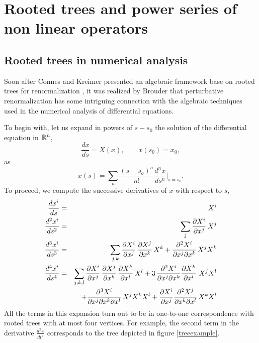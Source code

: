 \documentclass[10pt,here,feynmf]{article}
\begin{document}
\section{Rooted trees and power series of non linear operators}



\subsection{Rooted trees in numerical analysis}

Soon after Connes and Kreimer presented an algebraic framework base on rooted trees for renormalization \cite{ck0}, it was realized by Brouder \cite{brouder} that perturbative renormalization  has some intriguing connection with the algebraic techniques used in the numerical analysis of differential equations.

To begin with, let us expand in powers of $s-s_{0}$ the solution of the differential equation in ${\Bbb R}^{n}$, 
\begin{equation}
\frac{dx}{ds}=X(x),\qquad x(s_{0})=x_{0},\label{diffeq}
\end{equation}
as
\begin{equation}
x(s)=\sum_{n}\frac{(s-s_{o})^{n}}{n!}\frac{d^{n}x}{ds^{n}}\Big|_{s=s_{0}}.
\end{equation}
To proceed, we compute the successive derivatives of $x$ with respect to $s$,
\begin{eqnarray}
\frac{dx^{i}}{ds}&=&X^{i}\cr
\frac{d^{2}x^{i}}{ds^{2}}&=&\sum_{j}\frac{\partial X^{i}}{\partial x^{j}}\,X^{j}\cr
\frac{d^{3}x^{i}}{ds^{3}}&=&\sum_{j,k}\frac{\partial X^{i}}{\partial x^{j}}
\,\frac{\partial X^{j}}{\partial x^{k}}\,X^{k}
+\frac{\partial^{2}X^{i}}{\partial x^{j}\partial x^{k}}\,X^{j}X^{k}\cr
\frac{d^{4}x^{i}}{ds^{4}}&=&\sum_{j,k,l}\frac{\partial X^{i}}{\partial x^{j}}\,
\frac{\partial X^{j}}{\partial x^{k}}\,\frac{\partial X^{k}}{\partial x^{l}}\,X^{l}
+3\,\frac{\partial^{2}X^{i}}{\partial x^{j}\partial x^{k}}
\frac{\partial X^{k}}{\partial x^{l}}\,\,X^{j}X^{l}\cr
&&\quad+\frac{\partial^{3} X^{i}}{\partial x^{j}\partial x^{k}\partial x^{l}}
\,X^{j}X^{k}X^{l}
+\frac{\partial X^{i}}{\partial x^{j}}\frac{\partial^{2}X^{j}}{\partial x^{k}\partial x^{l}}\,X^{k}X^{l}
\label{expand}
\end{eqnarray}
All the terms in this expansion turn out to be in one-to-one correspondence with rooted trees with at most four vertices. For example, the second term in the derivative $\frac{d^{2}x}{dt^{2}}$ corresponds to the tree depicted in figure \ref{treeexample}.
\end{document}
